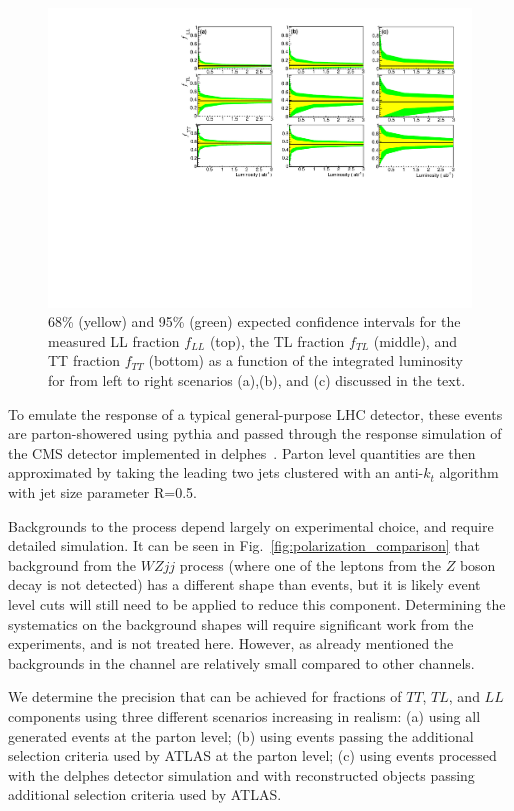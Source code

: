 \begin{figure}
\includegraphics[width=.9\textwidth]{./fig/12_LL_LT_TT.pdf}
\caption{ \label{fig:sensitivity} 68\% (yellow) and 95\% (green) expected confidence intervals for the measured LL fraction $f_{LL}$ (top), the TL fraction $f_{TL}$ (middle), and TT fraction $f_{TT}$ (bottom) as a function of the integrated luminosity for from left to right scenarios (a),(b), and (c) discussed in the text.}
\end{figure}


To emulate the response of a typical general-purpose LHC detector, these events are parton-showered using {\sc pythia}\cite{pythia} and passed through the  response simulation of the CMS detector implemented in {\sc delphes}~\cite{delphes}. Parton level quantities are then approximated by taking the leading two jets clustered with an anti-$k_t$ algorithm~\cite{antikt} with jet size parameter R=0.5.


Backgrounds to the \ssWW process depend largely on experimental choice, and require detailed simulation. It can be seen in Fig.~\ref{fig:polarization_comparison} that background from the $WZjj$ process (where one of 
the leptons from the $Z$ boson decay is not detected) has a different \ctsNN shape than \ssWW events, but it is likely event level cuts will still need to be applied to reduce this component. Determining the systematics on the background shapes will require significant work from the experiments, and is not treated here. However, as already mentioned the backgrounds in the \ssWW channel are relatively small compared to other channels.


We determine the precision that can be achieved for fractions of $TT$, $TL$, and $LL$ components using three different scenarios increasing in realism: (a) using all  generated events at the parton level; 
(b) using events passing the additional selection criteria used by ATLAS at the parton level; 
(c) using events processed with the {\sc delphes} detector simulation and with reconstructed objects passing additional selection criteria used by \mbox{ATLAS}. 


